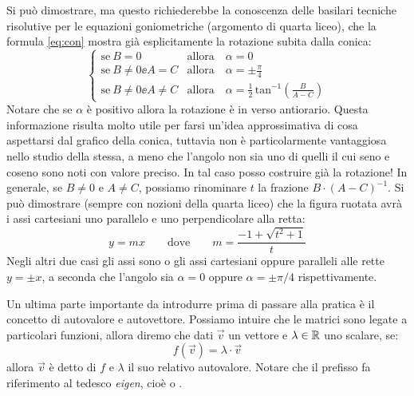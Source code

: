 \documentclass[a4paper, oneside]{article}
\begin{document}
		Si può dimostrare, ma questo richiederebbe la conoscenza delle basilari tecniche risolutive per le equazioni goniometriche (argomento di quarta liceo), che la formula \eqref{eq:con} mostra già esplicitamente la rotazione subita dalla conica:
		\begin{equation*}
			\left\{
			\begin{array}{ll} \displaystyle
				\mathrm{se}\ B=0 & \mathrm{allora} \quad \displaystyle \alpha=0 \\
				\mathrm{se}\ B\neq0 \ee A=C & \mathrm{allora} \quad \displaystyle \alpha=\pm \frac{\pi}{4} \\
				\mathrm{se}\ B\neq0 \ee A\neq C & \mathrm{allora} \quad  \displaystyle \alpha=\frac{1}{2}\,\mathrm{tan}^{-1}\left(\frac{B}{A-C}\right)
			\end{array} \right.
		\end{equation*}
		Notare che se $\alpha$ è positivo allora la rotazione è in verso antiorario.
		Questa informazione risulta molto utile per farsi un'idea approssimativa di cosa aspettarsi dal grafico della conica, tuttavia non è particolarmente vantaggiosa nello studio della stessa, a meno che l'angolo non sia uno di quelli il cui seno e coseno sono noti con valore preciso. In tal caso posso costruire già la rotazione!
		In generale, se $B\neq0$ e $A\neq C$, possiamo rinominare $t$ la frazione $B\cdot(A-C)^{-1}$. Si può dimostrare (sempre con nozioni della quarta liceo) che la figura ruotata avrà i  assi cartesiani uno parallelo e uno perpendicolare alla retta:
		\begin{equation*}
			y=mx \qquad \mathrm{dove} \qquad m=\frac{-1+\sqrt{t^2+1}}{t}
		\end{equation*}
		Negli altri due casi gli assi sono o gli assi cartesiani  oppure paralleli alle rette $y=\pm x$, a seconda che l'angolo sia $\alpha=0$ oppure $\alpha=\pm \pi/4$ rispettivamente.
		
		Un ultima parte importante da introdurre prima di passare alla pratica è il concetto di autovalore e autovettore. Possiamo intuire che le matrici sono legate a particolari funzioni, allora diremo che dati $\overrightarrow{v}$ un vettore e $\lambda\in\mathbb{R}$ uno scalare, se:
		\begin{equation*}
			f(\overrightarrow{v})=\lambda\cdot\overrightarrow{v}
		\end{equation*}
		allora $\overrightarrow{v}$ è detto  di $f$ e $\lambda$ il suo relativo autovalore. Notare che il prefisso  fa riferimento al tedesco \emph{eigen}, cioè  o .
		
\end{document}
